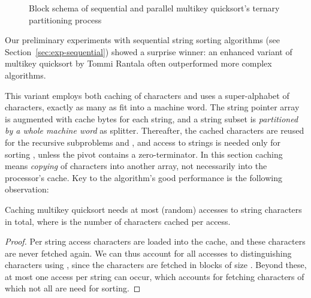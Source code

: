 \documentclass[a4paper]{myjournal}
\begin{document}
\begin{figure}
   \caption{Block schema of sequential and parallel multikey quicksort's ternary
    partitioning process}\label{fig:mkqs-blocks}
\end{figure}

Our preliminary experiments with sequential string sorting algorithms (see
Section~\ref{sec:exp-sequential}) showed a surprise winner: an enhanced variant
of multikey quicksort by Tommi Rantala \cite{rantala2007web} often outperformed
more complex algorithms.

This variant employs both caching of characters and uses a super-alphabet of  characters, exactly as many as fit into a machine word. The string pointer
array is augmented with  cache bytes for each string, and a string subset is
\emph{partitioned by a whole machine word} as splitter. Thereafter, the cached
characters are reused for the recursive subproblems  and
, and access to strings is needed only for sorting ,
unless the pivot contains a zero-terminator.  In this section caching means
\emph{copying} of characters into another array, not necessarily into the
processor's cache. Key to the algorithm's good performance is the following
observation:

\begin{theorem}\label{thm:mkqs-access}
  Caching multikey quicksort needs at most 
  (random) accesses to string characters in total, where  is the number of
  characters cached per access.
\end{theorem}
\begin{proof}
  Per string access  characters are loaded into the cache, and these 
  characters are never fetched again. We can thus account for all accesses to
  distinguishing characters using , since the
  characters are fetched in blocks of size . Beyond these, at most one access
  per string can occur, which accounts for fetching  characters of which not
  all are need for sorting.
\end{proof}
\end{document}
